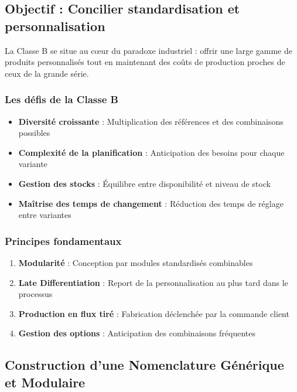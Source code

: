 \documentclass{article}
\begin{document}
\subsection{Objectif : Concilier standardisation et personnalisation}

La Classe B se situe au cœur du paradoxe industriel : offrir une large gamme de produits personnalisés tout en maintenant des coûts de production proches de ceux de la grande série.

\subsubsection{Les défis de la Classe B}

\begin{itemize}
    \item \textbf{Diversité croissante} : Multiplication des références et des combinaisons possibles
    \item \textbf{Complexité de la planification} : Anticipation des besoins pour chaque variante
    \item \textbf{Gestion des stocks} : Équilibre entre disponibilité et niveau de stock
    \item \textbf{Maîtrise des temps de changement} : Réduction des temps de réglage entre variantes
\end{itemize}

\subsubsection{Principes fondamentaux}

\begin{tcolorbox}[colback=vertclair, colframe=green!50!black, title=Principes de la Classe B]
\begin{enumerate}
    \item \textbf{Modularité} : Conception par modules standardisés combinables
    \item \textbf{Late Differentiation} : Report de la personnalisation au plus tard dans le processus
    \item \textbf{Production en flux tiré} : Fabrication déclenchée par la commande client
    \item \textbf{Gestion des options} : Anticipation des combinaisons fréquentes
\end{enumerate}
\end{tcolorbox}

\subsection{Construction d'une Nomenclature Générique et Modulaire}
\end{document}
